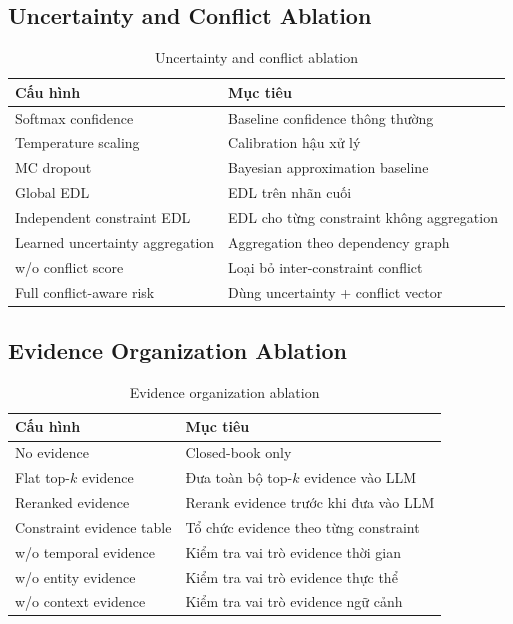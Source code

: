 \documentclass[11pt,a4paper]{article}
\begin{document}
\subsection{Uncertainty and Conflict Ablation}

\begin{table}[H]
\centering
\caption{Uncertainty and conflict ablation}
\begin{tabularx}{\linewidth}{lX}
\toprule
\textbf{Cấu hình} & \textbf{Mục tiêu}\\
\midrule
Softmax confidence & Baseline confidence thông thường\\
Temperature scaling & Calibration hậu xử lý\\
MC dropout & Bayesian approximation baseline\\
Global EDL & EDL trên nhãn cuối\\
Independent constraint EDL & EDL cho từng constraint không aggregation\\
Learned uncertainty aggregation & Aggregation theo dependency graph\\
w/o conflict score & Loại bỏ inter-constraint conflict\\
Full conflict-aware risk & Dùng uncertainty + conflict vector\\
\bottomrule
\end{tabularx}
\end{table}

\subsection{Evidence Organization Ablation}

\begin{table}[H]
\centering
\caption{Evidence organization ablation}
\begin{tabularx}{\linewidth}{lX}
\toprule
\textbf{Cấu hình} & \textbf{Mục tiêu}\\
\midrule
No evidence & Closed-book only\\
Flat top-$k$ evidence & Đưa toàn bộ top-$k$ evidence vào LLM\\
Reranked evidence & Rerank evidence trước khi đưa vào LLM\\
Constraint evidence table & Tổ chức evidence theo từng constraint\\
w/o temporal evidence & Kiểm tra vai trò evidence thời gian\\
w/o entity evidence & Kiểm tra vai trò evidence thực thể\\
w/o context evidence & Kiểm tra vai trò evidence ngữ cảnh\\
\bottomrule
\end{tabularx}
\end{table}
\end{document}

